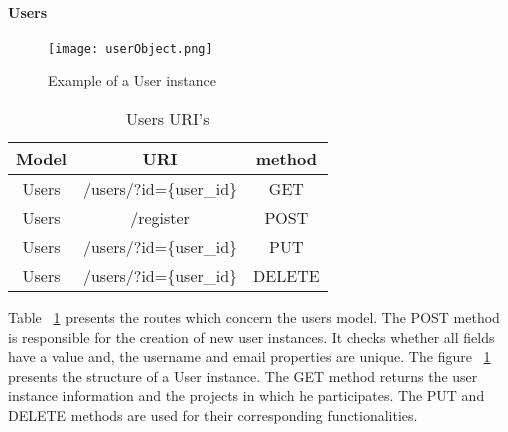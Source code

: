 \paragraph{Users}
\begin{figure}
	\centerline{\texttt{[image: userObject.png]}}
	\caption{Example of a User instance}
	\label{userObject}
\end{figure}
\begin{table}[]
\centering
\begin{tabular}{|c|c|c|}
\hline
\rowcolor[HTML]{32CB00} 
\textbf{Model} & \textbf{URI}                                                     & \textbf{method}                                     \\ \hline
\rowcolor[HTML]{FFFFFF} 
Users          & /users/?id=\{user\_id\}                                              & GET                                                 \\ \hline
\rowcolor[HTML]{67FD9A} 
Users          & /register                                                        & POST                                                \\ \hline
\rowcolor[HTML]{FFFFFF} 
Users          & /users/?id=\{user\_id\}                                              & PUT                                                 \\ \hline
\rowcolor[HTML]{67FD9A} 
Users          & \multicolumn{1}{l|}{\cellcolor[HTML]{67FD9A}/users/?id=\{user\_id\}} & \multicolumn{1}{l|}{\cellcolor[HTML]{67FD9A}DELETE} \\ \hline
\end{tabular}
\caption{Users URI's}
\label{usersURI}
\end{table}
Table ~\ref{usersURI} presents the routes which concern the users model. The POST method is responsible for the creation of new user instances. It checks whether all fields have a value and, the username and email properties are unique. The figure ~\ref{userObject} presents the structure of a User instance. The GET method returns the user instance information and the projects in which he participates. The PUT and DELETE methods are used for their corresponding functionalities.

